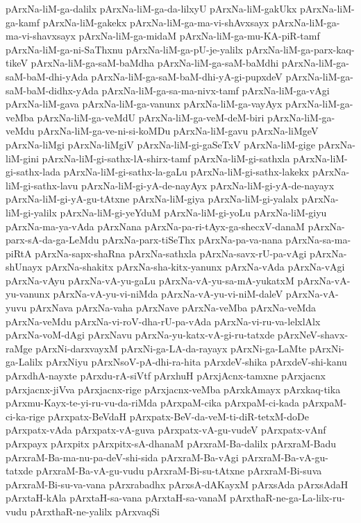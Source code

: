 {pArxNa-liM-ga-dalilx
pArxNa-liM-ga-da-lilxyU
pArxNa-liM-gakUkx
pArxNa-liM-ga-kamf
pArxNa-liM-gakekx
pArxNa-liM-ga-ma-vi-shAvxsayx
pArxNa-liM-ga-ma-vi-shavxsayx
pArxNa-liM-ga-midaM
pArxNa-liM-ga-mu-KA-piR-tamf
pArxNa-liM-ga-ni-SaThxnu
pArxNa-liM-ga-pU-je-yalilx
pArxNa-liM-ga-parx-kaq-tikeV
pArxNa-liM-ga-saM-baMdha
pArxNa-liM-ga-saM-baMdhi
pArxNa-liM-ga-saM-baM-dhi-yAda
pArxNa-liM-ga-saM-baM-dhi-yA-gi-pupxdeV
pArxNa-liM-ga-saM-baM-didhx-yAda
pArxNa-liM-ga-sa-ma-nivx-tamf
pArxNa-liM-ga-vAgi
pArxNa-liM-gava
pArxNa-liM-ga-vanunx
pArxNa-liM-ga-vayAyx
pArxNa-liM-ga-veMba
pArxNa-liM-ga-veMdU
pArxNa-liM-ga-veM-deM-biri
pArxNa-liM-ga-veMdu
pArxNa-liM-ga-ve-ni-si-koMDu
pArxNa-liM-gavu
pArxNa-liMgeV
pArxNa-liMgi
pArxNa-liMgiV
pArxNa-liM-gi-gaSeTxV
pArxNa-liM-gige
pArxNa-liM-gini
pArxNa-liM-gi-sathx-lA-shirx-tamf
pArxNa-liM-gi-sathxla
pArxNa-liM-gi-sathx-lada
pArxNa-liM-gi-sathx-la-gaLu
pArxNa-liM-gi-sathx-lakekx
pArxNa-liM-gi-sathx-lavu
pArxNa-liM-gi-yA-de-nayAyx
pArxNa-liM-gi-yA-de-nayayx
pArxNa-liM-gi-yA-gu-tAtxne
pArxNa-liM-giya
pArxNa-liM-gi-yalalx
pArxNa-liM-gi-yalilx
pArxNa-liM-gi-yeYduM
pArxNa-liM-gi-yoLu
pArxNa-liM-giyu
pArxNa-ma-ya-vAda
pArxNana
pArxNa-pa-ri-tAyx-ga-shecxV-danaM
pArxNa-parx-sA-da-ga-LeMdu
pArxNa-parx-tiSeThx
pArxNa-pa-va-nana
pArxNa-sa-ma-piRtA
pArxNa-sapx-shaRna
pArxNa-sathxla
pArxNa-savx-rU-pa-vAgi
pArxNa-shUnayx
pArxNa-shakitx
pArxNa-sha-kitx-yanunx
pArxNa-vAda
pArxNa-vAgi
pArxNa-vAyu
pArxNa-vA-yu-gaLu
pArxNa-vA-yu-sa-mA-yukatxM
pArxNa-vA-yu-vanunx
pArxNa-vA-yu-vi-niMda
pArxNa-vA-yu-vi-niM-daleV
pArxNa-vA-yuvu
pArxNava
pArxNa-vaha
pArxNave
pArxNa-veMba
pArxNa-veMda
pArxNa-veMdu
pArxNa-vi-roV-dha-rU-pa-vAda
pArxNa-vi-ru-va-lelxlAlx
pArxNa-voM-dAgi
pArxNavu
pArxNa-yu-katx-vA-gi-ru-tatxde
pArxNeV-shavx-raMge
pArxNi-darxvayxM
pArxNi-ga-LA-da-rayayx
pArxNi-ga-LaMte
pArxNi-ga-Lalilx
pArxNiyu
pArxNsoV-pA-dhi-ra-hita
pArxdeV-shika
pArxdeV-shi-kanu
pArxdhA-nayxte
pArxdu-rA-siVtf
pArxhuH
pArxjAcnx-tamxne
pArxjacnx
pArxjacnx-jiVva
pArxjacnx-rige
pArxjacnx-veMba
pArxkAmayx
pArxkaq-tika
pArxmu-Kayx-te-yi-ru-vu-da-riMda
pArxpaM-cika
pArxpaM-ci-kada
pArxpaM-ci-ka-rige
pArxpatx-BeVdaH
pArxpatx-BeV-da-veM-ti-diR-tetxM-doDe
pArxpatx-vAda
pArxpatx-vA-guva
pArxpatx-vA-gu-vudeV
pArxpatx-vAnf
pArxpayx
pArxpitx
pArxpitx-sA-dhanaM
pArxraM-Ba-dalilx
pArxraM-Badu
pArxraM-Ba-ma-nu-pa-deV-shi-sida
pArxraM-Ba-vAgi
pArxraM-Ba-vA-gu-tatxde
pArxraM-Ba-vA-gu-vudu
pArxraM-Bi-su-tAtxne
pArxraM-Bi-suva
pArxraM-Bi-su-va-vana
pArxrabadhx
pArxsA-dAKayxM
pArxsAda
pArxsAdaH
pArxtaH-kAla
pArxtaH-sa-vana
pArxtaH-sa-vanaM
pArxthaR-ne-ga-La-lilx-ru-vudu
pArxthaR-ne-yalilx
pArxvaqSi
}
